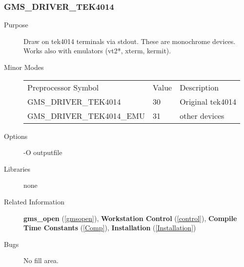 \subsubsection{GMS\_DRIVER\_TEK4014\label{tek4014}}
\begin{description}
\item[Purpose]\mbox{}


Draw on tek4014 terminals via stdout. These  are monochrome devices.
Works also with emulators (vt2*, xterm, kermit).
\item[Minor Modes]\mbox{}


\begin{center}
\begin{tabular}{lll}\hline
Preprocessor Symbol & Value& Description\\ 
GMS\_DRIVER\_TEK4014 &  30& Original tek4014\\ 
GMS\_DRIVER\_TEK4014\_EMU &  31& other devices\\ 
\hline\end{tabular}
\end{center}

\item[Options]\mbox{}


-O outputfile
\item[Libraries]\mbox{}


none
\item[Related Information]\mbox{}


{\bf gms\_open} (\ref{gmsopen}), 
{\bf Workstation Control} (\ref{control}), 
{\bf Compile Time Constants} (\ref{Comp}), 
{\bf Installation} (\ref{Installation}) 
\item[Bugs]\mbox{}


No fill area.
\end{description}



\newpage



